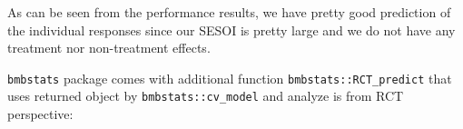\documentclass[
]{book}
\newenvironment{Shaded}{\begin{snugshade}}{\end{snugshade}}
\newcommand{\DataTypeTok}[1]{\textcolor[rgb]{0.13,0.29,0.53}{#1}}
\newcommand{\KeywordTok}[1]{\textcolor[rgb]{0.13,0.29,0.53}{\textbf{#1}}}
\newcommand{\NormalTok}[1]{#1}
\newcommand{\OperatorTok}[1]{\textcolor[rgb]{0.81,0.36,0.00}{\textbf{#1}}}
\newcommand{\StringTok}[1]{\textcolor[rgb]{0.31,0.60,0.02}{#1}}
\begin{document}
As can be seen from the performance results, we have pretty good prediction of the individual responses since our SESOI is pretty large and we do not have any treatment nor non-treatment effects.

\texttt{bmbstats} package comes with additional function \texttt{bmbstats::RCT\_predict} that uses returned object by \texttt{bmbstats::cv\_model} and analyze is from RCT perspective:

\begin{Shaded}
\end{Shaded}
\end{document}
